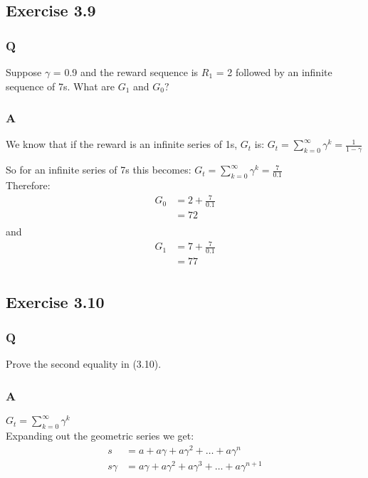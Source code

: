 \subsection{Exercise 3.9}
\subsubsection*{Q}
Suppose \(\gamma\)  = 0.9 and the reward sequence is $R_1$ = 2 followed by an infinite sequence of 7s. What are $G_1$ and $G_0?$

\subsubsection*{A}
We know that if the reward is an infinite series of 1s, $G_t$ is:
$
G_t = \sum_{k=0}^{\infty} \gamma^k = \frac{1}{1-\gamma}
$

So for an infinite series of 7s this becomes:
$
G_t = \sum_{k=0}^{\infty} \gamma^k = \frac{7}{0.1}
$
\\
Therefore:
\begin{align}
G_0 &= 2 + \frac{7}{0.1} \\
&= 72\\
\end{align}
and 
\begin{align}
G_1 &= 7 + \frac{7}{0.1} \\
&= 77\\
\end{align}


\subsection{Exercise 3.10}
\subsubsection*{Q}
Prove the second equality in (3.10). 

\subsubsection*{A}
$
G_t = \sum_{k=0}^{\infty} \gamma^k
$
\\
Expanding out the geometric series we get:
\begin{align}
s &= a + a\gamma + a\gamma^2 + \ldots + a\gamma^n\\
s\gamma &= a\gamma + a\gamma^2 + a\gamma^3+ \ldots + a\gamma^{n+1}\\
\end{align}

